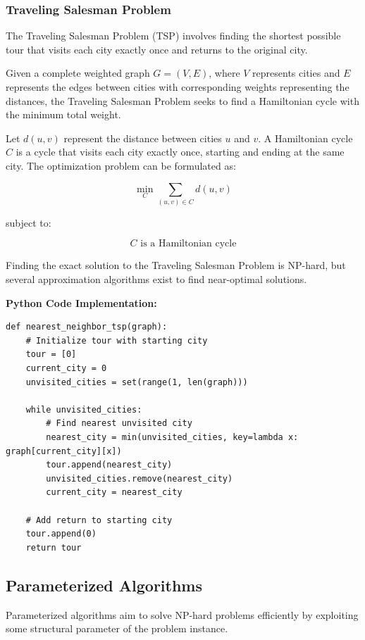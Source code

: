 \subsubsection{Traveling Salesman Problem}
The Traveling Salesman Problem (TSP) involves finding the shortest possible tour that visits each city exactly once and returns to the original city.

Given a complete weighted graph \(G = (V, E)\), where \(V\) represents cities and \(E\) represents the edges between cities with corresponding weights representing the distances, the Traveling Salesman Problem seeks to find a Hamiltonian cycle with the minimum total weight.

Let \(d(u, v)\) represent the distance between cities \(u\) and \(v\). A Hamiltonian cycle \(C\) is a cycle that visits each city exactly once, starting and ending at the same city. The optimization problem can be formulated as:

\[
\min_{C} \sum_{(u, v) \in C} d(u, v)
\]

subject to:

\[
C \text{ is a Hamiltonian cycle}
\]

Finding the exact solution to the Traveling Salesman Problem is NP-hard, but several approximation algorithms exist to find near-optimal solutions.

\textbf{Python Code Implementation:}
\FloatBarrier
\begin{lstlisting}
def nearest_neighbor_tsp(graph):
    # Initialize tour with starting city
    tour = [0]
    current_city = 0
    unvisited_cities = set(range(1, len(graph)))
    
    while unvisited_cities:
        # Find nearest unvisited city
        nearest_city = min(unvisited_cities, key=lambda x: graph[current_city][x])
        tour.append(nearest_city)
        unvisited_cities.remove(nearest_city)
        current_city = nearest_city
    
    # Add return to starting city
    tour.append(0)
    return tour
\end{lstlisting}
\FloatBarrier


\subsection{Parameterized Algorithms}

Parameterized algorithms aim to solve NP-hard problems efficiently by exploiting some structural parameter of the problem instance.


